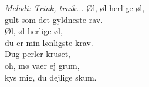 {\footnotesize\textit{Melodi: Trink, trnik...}}
\vspace{10pt}
Øl, øl herlige øl,\\
gult som det gyldneste rav.\\
Øl, øl herlige øl,\\
du er min lønligste krav.\\
\revrpt Dug perler kruset,\\
oh, mø vaer ej grum,\\
kys mig, du dejlige skum.\rpt
